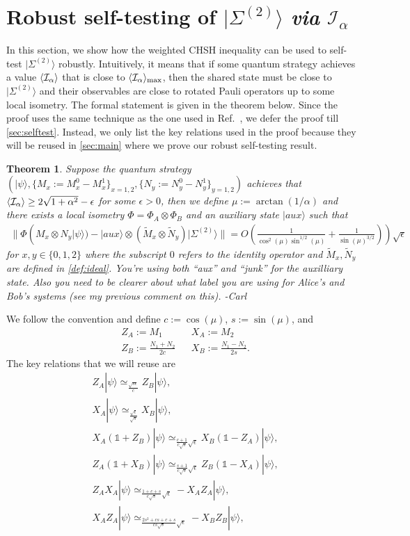 \documentclass[11pt,letterpaper]{article}
\newcommand{\ket}[1]{|#1\rangle}
\newcommand{\x}{\otimes}
\DeclarePairedDelimiter{\ip}{\langle}{\rangle}
\newcommand{\1}{\mathbb{1}}
\newcommand{\EPR}[1]{\Sigma^{(#1)}}
\newcommand{\tM}{\tilde{M}}
\newcommand{\tN}{\tilde{N}}
\newcommand{\I}{\mathcal{I}}
\newcommand{\se}{\sqrt{\epsilon}}
\newcommand{\appd}[1]{\simeq_{#1}}
\def\carl#1{{\color{blue} #1 -Carl}}
\newtheorem{theorem}{Theorem}[section]
\theoremstyle{definition}
\begin{document}
\section{Robust self-testing of $\ket{\EPR{2}}$ \textit{via} $\I_\alpha$}
\label{sec:chsh}
In this section, we show how the weighted CHSH inequality can be used to self-test $\ket{\EPR{2}}$ robustly.
Intuitively, it means that if some quantum strategy achieves a value $\ip{\I_\alpha}$ that is close to $\ip{\I_\alpha}_{\max}$,
then the shared state must be close to $\ket{\EPR{2}}$ and their observables are close to rotated Pauli operators up to
some local isometry.
The formal statement is given in the theorem below. Since the proof uses the same technique as the one used in Ref.~\cite{bamps2015},
we defer the proof till \cref{sec:selftest}. Instead, we only list the key relations used in the proof because they will be reused in 
\cref{sec:main} where we prove our robust self-testing result.
\begin{theorem}
\label{thm:selftest}
	Suppose the quantum strategy $(\ket{\psi}, \{M_x:=M_x^0-M_x^1\}_{x=1,2}, \{N_y :=N_y^0-N_y^1\}_{y = 1,2} )$ achieves that
	$\ip{\I_\alpha} \geq 2\sqrt{1+\alpha^2} - \epsilon$
	for some $\epsilon > 0$, then we define $\mu := \arctan(1/\alpha)$ and
	there exists a local isometry $\Phi = \Phi_A \x \Phi_B$ and an auxiliary state $\ket{aux}$  such that
	\begin{align*}
		\| \Phi( M_x \x N_y \ket{\psi}) -\ket{aux} \x (\tM_x \x \tN_y) \ket{\EPR{2}}  \| = O(\frac{1}{\cos^2(\mu)\sin^{1/2}(\mu)}+
		\frac{1}{\sin(\mu)^{3/2}})) \sqrt{\epsilon}
	\end{align*}
	for $x,y \in \{0, 1, 2\}$ where the subscript $0$ refers to the identity operator and $\tM_x, \tN_y$ are 
	defined in \cref{def:ideal}.  \carl{You're using both ``aux'' and ``junk'' for the auxilliary state.  Also you need
	to be clearer about what label you are using for Alice's and Bob's systems (see my previous comment on this).}
\end{theorem}
We follow the convention and define $c := \cos(\mu)$, $s := \sin(\mu)$, and
\begin{align}
	&Z_A := M_1 && X_A := M_2\\
	&Z_B := \frac{N_1+N_2}{2c} && X_B := \frac{N_1-N_2}{2s}.
\end{align}
The key relations that we will reuse are
\begin{align}
	\label{eq:za-zb}& Z_A\ket{\psi} \appd{\frac{\sqrt{s\epsilon}}{c}} Z_B\ket{\psi},\\
	\label{eq:xa-xb}&X_A\ket{\psi} \appd{\frac{\sqrt{\epsilon}}{\sqrt{s}}} X_B \ket{\psi}, \\
	\label{eq:xazb}&X_A(\1+Z_B)\ket{\psi} \appd{\frac{c+1}{c\sqrt{s}} \se} X_B(\1-Z_A) \ket{\psi},\\
	\label{eq:zaxb}&Z_A(\1+X_B)\ket{\psi} \appd{ \frac{s+1}{c\sqrt{s}} \se} Z_B(\1-X_A) \ket{\psi},\\
	\label{eq:zaxa}&Z_AX_A\ket{\psi} \appd{\frac{1+c+s}{c\sqrt{s}} \se} -X_AZ_A \ket{\psi},\\
	\label{eq:zaxaxbzb}&X_AZ_A \ket{\psi} \appd{\frac{2s^2+cs+c+s}{cs\sqrt{s}} \sqrt{\epsilon}} -X_BZ_B \ket{\psi},
\end{align}
\end{document}
